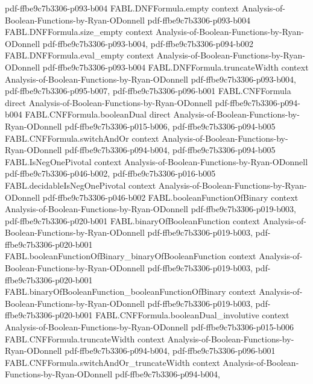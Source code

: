 \begin{theorem}
  {pdf-ffbe9c7b3306-p093-b004}
\proofstep
  {FABL.DNFFormula.empty}
  {context}
  {Analysis-of-Boolean-Functions-by-Ryan-ODonnell}
  {pdf-ffbe9c7b3306-p093-b004}
\proofstep
  {FABL.DNFFormula.size_empty}
  {context}
  {Analysis-of-Boolean-Functions-by-Ryan-ODonnell}
  {pdf-ffbe9c7b3306-p093-b004,
    pdf-ffbe9c7b3306-p094-b002}
\proofstep
  {FABL.DNFFormula.eval_empty}
  {context}
  {Analysis-of-Boolean-Functions-by-Ryan-ODonnell}
  {pdf-ffbe9c7b3306-p093-b004}
\proofstep
  {FABL.DNFFormula.truncateWidth}
  {context}
  {Analysis-of-Boolean-Functions-by-Ryan-ODonnell}
  {pdf-ffbe9c7b3306-p093-b004,
    pdf-ffbe9c7b3306-p095-b007,
    pdf-ffbe9c7b3306-p096-b001}
\proofstep
  {FABL.CNFFormula}
  {direct}
  {Analysis-of-Boolean-Functions-by-Ryan-ODonnell}
  {pdf-ffbe9c7b3306-p094-b004}
\proofstep
  {FABL.CNFFormula.booleanDual}
  {direct}
  {Analysis-of-Boolean-Functions-by-Ryan-ODonnell}
  {pdf-ffbe9c7b3306-p015-b006,
    pdf-ffbe9c7b3306-p094-b005}
\proofstep
  {FABL.CNFFormula.switchAndOr}
  {context}
  {Analysis-of-Boolean-Functions-by-Ryan-ODonnell}
  {pdf-ffbe9c7b3306-p094-b004,
    pdf-ffbe9c7b3306-p094-b005}
\proofstep
  {FABL.IsNegOnePivotal}
  {context}
  {Analysis-of-Boolean-Functions-by-Ryan-ODonnell}
  {pdf-ffbe9c7b3306-p046-b002,
    pdf-ffbe9c7b3306-p016-b005}
\proofstep
  {FABL.decidableIsNegOnePivotal}
  {context}
  {Analysis-of-Boolean-Functions-by-Ryan-ODonnell}
  {pdf-ffbe9c7b3306-p046-b002}
\proofstep
  {FABL.booleanFunctionOfBinary}
  {context}
  {Analysis-of-Boolean-Functions-by-Ryan-ODonnell}
  {pdf-ffbe9c7b3306-p019-b003,
    pdf-ffbe9c7b3306-p020-b001}
\proofstep
  {FABL.binaryOfBooleanFunction}
  {context}
  {Analysis-of-Boolean-Functions-by-Ryan-ODonnell}
  {pdf-ffbe9c7b3306-p019-b003,
    pdf-ffbe9c7b3306-p020-b001}
\proofstep
  {FABL.booleanFunctionOfBinary_binaryOfBooleanFunction}
  {context}
  {Analysis-of-Boolean-Functions-by-Ryan-ODonnell}
  {pdf-ffbe9c7b3306-p019-b003,
    pdf-ffbe9c7b3306-p020-b001}
\proofstep
  {FABL.binaryOfBooleanFunction_booleanFunctionOfBinary}
  {context}
  {Analysis-of-Boolean-Functions-by-Ryan-ODonnell}
  {pdf-ffbe9c7b3306-p019-b003,
    pdf-ffbe9c7b3306-p020-b001}
\proofstep
  {FABL.CNFFormula.booleanDual_involutive}
  {context}
  {Analysis-of-Boolean-Functions-by-Ryan-ODonnell}
  {pdf-ffbe9c7b3306-p015-b006}
\proofstep
  {FABL.CNFFormula.truncateWidth}
  {context}
  {Analysis-of-Boolean-Functions-by-Ryan-ODonnell}
  {pdf-ffbe9c7b3306-p094-b004,
    pdf-ffbe9c7b3306-p096-b001}
\proofstep
  {FABL.CNFFormula.switchAndOr_truncateWidth}
  {context}
  {Analysis-of-Boolean-Functions-by-Ryan-ODonnell}
  {pdf-ffbe9c7b3306-p094-b004,
}
\end{theorem}
